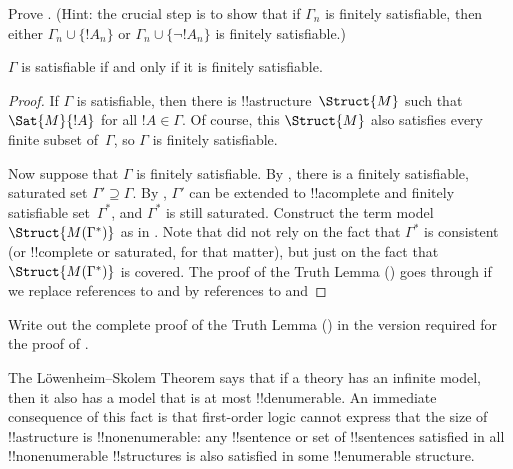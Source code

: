 \begin{prob}
Prove .  (Hint: the crucial
step is to show that if $\Gamma_n$ is finitely satisfiable, then
either $\Gamma_n \cup \{!A_n\}$ or $\Gamma_n \cup \{\lnot !A_n\}$ is
finitely satisfiable.)
\end{prob}




\begin{thm}[Compactness]
 $\Gamma$ is satisfiable if and only
if it is finitely satisfiable.
\end{thm}

\begin{proof}
If $\Gamma$ is satisfiable, then there is
!!a{structure}~$\Struct{M}$
such that $\Sat{M}{!A}$ for all $!A \in \Gamma$.
Of course, this $\Struct{M}$ also
satisfies every finite subset of~$\Gamma$, so $\Gamma$ is finitely
satisfiable.

Now suppose that $\Gamma$ is finitely satisfiable. By
  , there is a finitely satisfiable, saturated
  set $\Gamma' \supseteq \Gamma$. By ,
$\Gamma'$ can be extended to !!a{complete} and
finitely satisfiable set~$\Gamma^*$, and $\Gamma^*$ is
  still saturated. Construct the term
  model~$\Struct{M(\Gamma^*)}$
as in . Note that
 did not rely on the fact that
$\Gamma^*$ is consistent (or !!{complete} or saturated, for that
matter), but just on the fact that $\Struct{M(\Gamma^*)}$ is covered.
The proof of the Truth Lemma () goes through if
we replace references to  and
 by references to
 and 
\end{proof}


\begin{prob}
Write out the complete proof of the Truth Lemma
() in the version required for the
proof of .
\end{prob}







  


The L\"owenheim--Skolem Theorem says that if a theory has an infinite
model, then it also has a model that is at most !!{denumerable}. An
immediate consequence of this fact is that first-order logic cannot
express that the size of !!a{structure} is !!{nonenumerable}: any
!!{sentence} or set of !!{sentence}s satisfied in all
!!{nonenumerable} !!{structure}s is also satisfied in some
!!{enumerable} structure.

